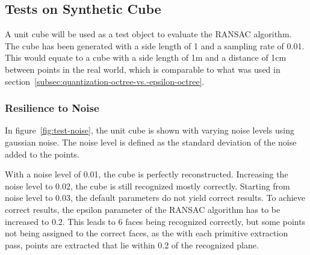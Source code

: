\subsection{Tests on Synthetic Cube}\label{subsec:tests-on-singular-synthetic-cube}

A unit cube will be used as a test object to evaluate the RANSAC algorithm.
The cube has been generated with a side length of 1 and a sampling rate of 0.01.
This would equate to a cube with a side length of 1m and a distance of 1cm between points in the real world,
which is comparable to what was used in section~\ref{subsec:quantization-octree-vs.-epsilon-octree}.

\subsubsection{Resilience to Noise}
In figure~\ref{fig:test-noise}, the unit cube is shown with varying noise levels using gaussian noise.
The noise level is defined as the standard deviation of the noise added to the points.

With a noise level of 0.01, the cube is perfectly reconstructed.
Increasing the noise level to 0.02, the cube is still recognized mostly correctly.
Starting from noise level to 0.03, the default parameters do not yield correct results.
To achieve correct results, the epsilon parameter of the RANSAC algorithm has to be increased to 0.2.
This leads to 6 faces being recognized correctly, but some points not being assigned to the correct faces,
as the with each primitive extraction pass, points are extracted that lie within 0.2 of the recognized plane.


